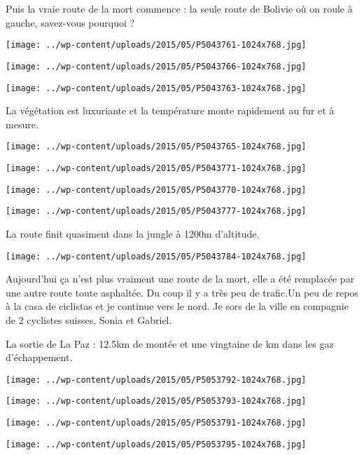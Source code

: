Puis la vraie route de la mort commence : la seule route de Bolivie où on roule à gauche, savez-vous pourquoi ? 
\begin{center} \texttt{[image: ../wp-content/uploads/2015/05/P5043761-1024x768.jpg]} \end{center}

\begin{center} \texttt{[image: ../wp-content/uploads/2015/05/P5043766-1024x768.jpg]} \end{center}
\begin{center} \texttt{[image: ../wp-content/uploads/2015/05/P5043763-1024x768.jpg]} \end{center}
\pagebreak

La végétation est luxuriante et la température monte rapidement au fur et à mesure. 
\begin{center} \texttt{[image: ../wp-content/uploads/2015/05/P5043765-1024x768.jpg]} \end{center}
\begin{center} \texttt{[image: ../wp-content/uploads/2015/05/P5043771-1024x768.jpg]} \end{center}

\begin{center} \texttt{[image: ../wp-content/uploads/2015/05/P5043770-1024x768.jpg]} \end{center}
\begin{center} \texttt{[image: ../wp-content/uploads/2015/05/P5043777-1024x768.jpg]} \end{center}
\pagebreak

La route finit quasiment dans la jungle à 1200m d'altitude. 
\begin{center} \texttt{[image: ../wp-content/uploads/2015/05/P5043784-1024x768.jpg]} \end{center}

Aujourd'hui ça n'est plus vraiment une route de la mort, elle a été remplacée par une autre route toute asphaltée. Du coup il y a très peu de trafic.Un peu de repos à la casa de ciclistas et je continue vers le nord. Je sors de la ville en compagnie de 2 cyclistes suisses, Sonia et Gabriel.

La sortie de La Paz : 12.5km de montée et une vingtaine de km dans les gaz d'échappement. 
\begin{center} \texttt{[image: ../wp-content/uploads/2015/05/P5053792-1024x768.jpg]} \end{center}

\begin{center} \texttt{[image: ../wp-content/uploads/2015/05/P5053793-1024x768.jpg]} \end{center}
\begin{center} \texttt{[image: ../wp-content/uploads/2015/05/P5053791-1024x768.jpg]} \end{center}

\begin{center} \texttt{[image: ../wp-content/uploads/2015/05/P5053795-1024x768.jpg]} \end{center}
